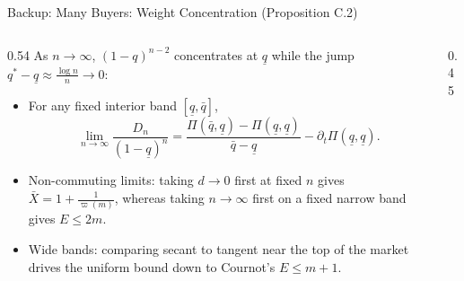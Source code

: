 \documentclass[11pt,aspectratio=169]{beamer}
\def\meditem{\smallskip\item}
\newcommand{\uq}{\underline q}
\newcommand{\oq}{\bar q}
\begin{document}
\begin{frame}[noframenumbering]{Backup: Many Buyers: Weight Concentration (Proposition C.2)}
\begin{columns}[T]
\begin{column}{0.54\textwidth}
As $n\to\infty$, $(1-q)^{n-2}$ concentrates at $\uq$ while the jump $q^*-\uq\approx\frac{\log n}{n}\to 0$:
\begin{itemize}
\item For any fixed interior band $[\uq,\oq]$,
\[
\lim_{n\to\infty}\frac{D_n}{(1-\uq)^n} = \frac{\Pi(\oq,\uq)-\Pi(\uq,\uq)}{\oq-\uq} - \partial_t\Pi(\uq,\uq).
\]
\meditem \alert{Non-commuting limits}: taking $d\to 0$ first at fixed $n$ gives $\bar X=1+\frac{1}{\varpi(m)}$, whereas taking $n\to\infty$ first on a fixed narrow band gives $E\le 2m$.
\meditem \alert{Wide bands}: comparing secant to tangent near the top of the market drives the uniform bound down to Cournot's $E\le m+1$.
\end{itemize}
\end{column}
\begin{column}{0.45\textwidth}
\centering
{}
\end{column}
\end{columns}
\end{frame}
\end{document}
